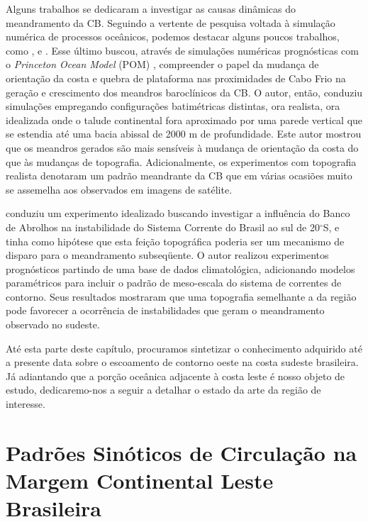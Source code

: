 Alguns trabalhos se dedicaram a investigar as causas dinâmicas do meandramento
da CB. Seguindo a vertente de pesquisa voltada à simulação numérica de processos oceânicos,
 podemos destacar alguns poucos trabalhos, como \cite{velhote1998}, \cite{goncalves2000}
e \cite{calado2001}. Esse último buscou, através de simulações numéricas prog\-nós\-ti\-cas 
com o {\it Princeton Ocean Model} (POM) \citep{blumberg_mellor1987}, compreender o papel da mudança 
de orientação da costa e quebra de plataforma nas proximidades de Cabo Frio na geração
e crescimento dos meandros baroclínicos da CB. O autor, então, conduziu simulações
empregando configurações batimétricas distintas, ora realista, ora idealizada onde o talude
continental fora aproximado por uma parede vertical que se estendia até uma bacia abissal
de 2000 m de profundidade. Este autor mostrou que os meandros gerados são 
mais sensíveis à mudança de orientação da costa do que às mudanças de topografia.
Adicionalmente, os experimentos com topografia realista denotaram um
padrão meandrante da CB que em várias ocasiões muito se assemelha aos observados
em imagens de satélite.

\cite{soares2007} conduziu um
experimento idealizado buscando investigar a influência do Banco de Abrolhos
na instabilidade do Sistema Corrente do Brasil ao sul de 20$^\circ$S, e tinha como hipótese que 
esta feição topográfica poderia ser um mecanismo de disparo para o meandramento
subseq\"uente. O autor realizou experimentos prognósticos partindo de uma base de dados
climatológica, adicionando modelos paramétricos para incluir o padrão de meso-escala do sistema de correntes 
de contorno. Seus resultados mostraram que uma topografia semelhante a da região
pode favorecer a ocorrência de instabilidades que geram o meandramento observado no sudeste.

Até esta parte deste capítulo, procuramos sintetizar o conhecimento adquirido 
até a presente data sobre o escoamento de contorno oeste na costa sudeste 
brasileira. Já adiantando que a porção oceânica adjacente à costa leste é nosso objeto de estudo, 
dedicaremo-nos a seguir a detalhar o estado da arte da região de interesse.
  

\section{Padrões Sinóticos de Circulação na Margem Continental Leste Brasileira}\label{sec:cleste}

